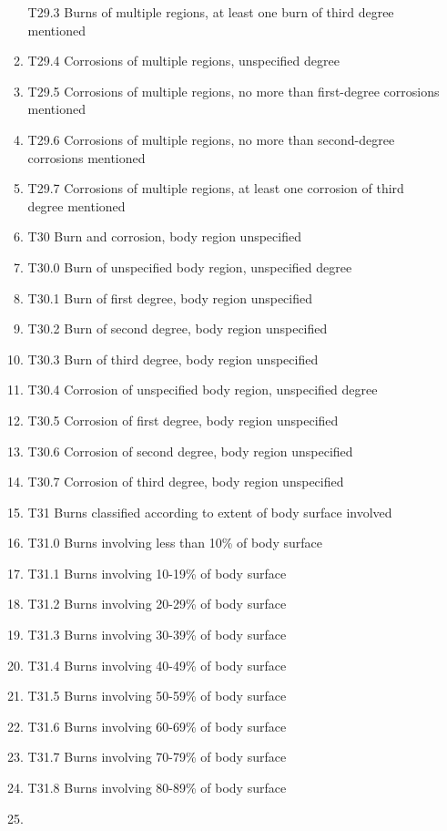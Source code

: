 \documentclass[
]{scrartcl}
\begin{document}
\begin{itemize}
\begin{enumerate}
    T29.3 Burns of multiple regions, at least one burn of third degree
    mentioned
  \item
    T29.4 Corrosions of multiple regions, unspecified degree
  \item
    T29.5 Corrosions of multiple regions, no more than first-degree
    corrosions mentioned
  \item
    T29.6 Corrosions of multiple regions, no more than second-degree
    corrosions mentioned
  \item
    T29.7 Corrosions of multiple regions, at least one corrosion of
    third degree mentioned
  \item
    T30 Burn and corrosion, body region unspecified
  \item
    T30.0 Burn of unspecified body region, unspecified degree
  \item
    T30.1 Burn of first degree, body region unspecified
  \item
    T30.2 Burn of second degree, body region unspecified
  \item
    T30.3 Burn of third degree, body region unspecified
  \item
    T30.4 Corrosion of unspecified body region, unspecified degree
  \item
    T30.5 Corrosion of first degree, body region unspecified
  \item
    T30.6 Corrosion of second degree, body region unspecified
  \item
    T30.7 Corrosion of third degree, body region unspecified
  \item
    T31 Burns classified according to extent of body surface involved
  \item
    T31.0 Burns involving less than 10\% of body surface
  \item
    T31.1 Burns involving 10-19\% of body surface
  \item
    T31.2 Burns involving 20-29\% of body surface
  \item
    T31.3 Burns involving 30-39\% of body surface
  \item
    T31.4 Burns involving 40-49\% of body surface
  \item
    T31.5 Burns involving 50-59\% of body surface
  \item
    T31.6 Burns involving 60-69\% of body surface
  \item
    T31.7 Burns involving 70-79\% of body surface
  \item
    T31.8 Burns involving 80-89\% of body surface
  \item

\end{enumerate}
\end{itemize}
\end{document}
